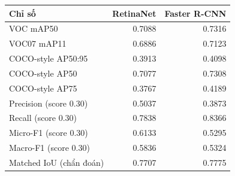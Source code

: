 \begin{tabular}{lrr}
\toprule
Chỉ số & RetinaNet & Faster R-CNN\\
\midrule
VOC mAP50 & 0.7088 & 0.7316\\
VOC07 mAP11 & 0.6886 & 0.7123\\
COCO-style AP50:95 & 0.3913 & 0.4098\\
COCO-style AP50 & 0.7077 & 0.7308\\
COCO-style AP75 & 0.3767 & 0.4189\\
Precision (score 0.30) & 0.5037 & 0.3873\\
Recall (score 0.30) & 0.7838 & 0.8366\\
Micro-F1 (score 0.30) & 0.6133 & 0.5295\\
Macro-F1 (score 0.30) & 0.5836 & 0.5324\\
Matched IoU (chẩn đoán) & 0.7707 & 0.7775\\
\bottomrule
\end{tabular}
